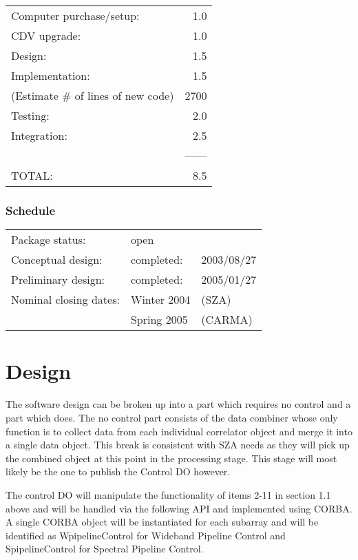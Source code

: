\documentclass[11pt]{article}
\begin{document}
\bigskip
\begin{tabular}{lr}
Computer purchase/setup:& 1.0\\
CDV upgrade:&  1.0\\
Design:&                  1.5\\
Implementation:&          1.5\\
(Estimate \# of lines of new code)&2700\\
Testing:&                 2.0\\
Integration:&             2.5\\
& ------\\
TOTAL:&                   8.5
\end{tabular}
%
%
\subsubsection{Schedule}
%
%
\begin{tabular}{lll}
Package status:& open&\\
Conceptual design:&  completed:& 2003/08/27\\
Preliminary design:& completed:& 2005/01/27\\
\noalign{\vspace{0.5em}}
Nominal closing dates:&  Winter 2004& (SZA) \\
& Spring 2005& (CARMA)\\
\end{tabular}


%
%
\section{Design}
%
%
The software design can be broken up into a part which requires no control and
a part which does. The no control part consists of the data combiner whose
only function is to collect data from each individual correlator object and
merge it into a single data object. This break is consistent with SZA needs as
they will pick up the combined object at this point in the processing stage.
This stage will most likely be the one to publish the Control DO however.

The control DO will manipulate the functionality of items 2-11 in section
1.1 above and will be 
handled via the following API and implemented using CORBA. A single 
CORBA object will be instantiated for each subarray and will be 
identified as WpipelineControl for Wideband
Pipeline Control and SpipelineControl for Spectral Pipeline Control.
\end{document}
